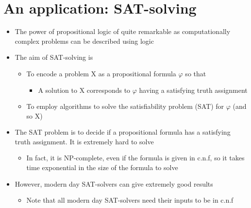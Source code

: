\documentclass{article}[18pt]
\begin{document}
\section{An application: SAT-solving}
\begin{itemize}
\item The power of propositional logic of quite remarkable as computationally complex problems can be described using logic
\item The aim of SAT-solving is
\begin{itemize}
\item To encode a problem X as a propositional formula $\varphi$ so that
\begin{itemize}
\item A solution to X corresponds to $\varphi$ having a satisfying truth assignment
\end{itemize}
\item To employ algorithms to solve the satisfiability problem (SAT) for $\varphi$ (and so X)
\end{itemize}


\item The SAT problem is to decide if a propositional formula has a satisfying truth assignment. It is extremely hard to solve
\begin{itemize}
\item In fact, it is NP-complete, even if the formula is given in c.n.f, so it takes time exponential in the size of the formula to solve 
\end{itemize} 
\item However, modern day SAT-solvers can give extremely good results
\begin{itemize}
\item Note that all modern day SAT-solvers need their inputs to be in c.n.f
\end{itemize}
\end{itemize}
\end{document}
